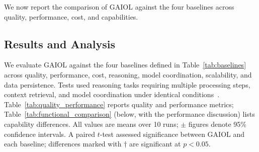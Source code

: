 \documentclass{iopjournal}
\begin{document}
We now report the comparison of GAIOL against the four baselines across quality, performance, cost, and capabilities.

\subsection{Results and Analysis}

We evaluate GAIOL against the four baselines defined in Table~\ref{tab:baselines} across quality, performance, cost, reasoning, model coordination, scalability, and data persistence. Tests used reasoning tasks requiring multiple processing steps, context retrieval, and model coordination under identical conditions~\cite{HolisticEval}. Table~\ref{tab:quality_performance} reports quality and performance metrics; Table~\ref{tab:functional_comparison} (below, with the performance discussion) lists capability differences. All values are means over 10 runs; $\pm$ figures denote 95\% confidence intervals. A paired $t$-test assessed significance between GAIOL and each baseline; differences marked with $\dagger$ are significant at $p < 0.05$.
\end{document}
